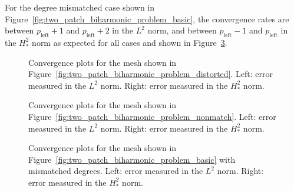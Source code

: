 For the degree mismatched case shown in Figure~\ref{fig:two_patch_biharmonic_problem_basic}, the convergence rates are between $p_\text{left}+1$ and $p_\text{left}+2$ in the $L^2$ norm, and between $p_\text{left}-1$ and $p_\text{left}$ in the $H^2_*$ norm as expected for all cases and shown in Figure~\ref{fig:two_patc_biharmonic_convergence_diff_degree}. \par

\begin{figure}[ht]
	\centering
	\begin{subfigure}[b]{0.47\textwidth}
		
	\end{subfigure}
	\hfill
	\begin{subfigure}[b]{0.47\textwidth}
		
	\end{subfigure}
	\caption{Convergence plots for the mesh shown in Figure~\ref{fig:two_patch_biharmonic_problem_distorted}. Left: error measured in the $L^2$ norm. Right: error measured in the $H^2_*$ norm.}\label{fig:two_patc_biharmonic_convergence_distorted}
\end{figure}

\begin{figure}[ht]
	\centering
	\begin{subfigure}[b]{0.47\textwidth}
		
	\end{subfigure}
	\hfill
	\begin{subfigure}[b]{0.47\textwidth}
		
	\end{subfigure}
	\caption{Convergence plots for the mesh shown in Figure~\ref{fig:two_patch_biharmonic_problem_nonmatch}. Left: error measured in the $L^2$ norm. Right: error measured in the $H^2_*$ norm.}\label{fig:two_patc_biharmonic_convergence_nonmatch}
\end{figure}

\begin{figure}[ht]
	\centering
	\begin{subfigure}[b]{0.47\textwidth}
		
	\end{subfigure}
	\hfill
	\begin{subfigure}[b]{0.47\textwidth}
		
	\end{subfigure}
	\caption{Convergence plots for the mesh shown in Figure~\ref{fig:two_patch_biharmonic_problem_basic} with mismatched degrees. Left: error measured in the $L^2$ norm. Right: error measured in the $H^2_*$ norm.}\label{fig:two_patc_biharmonic_convergence_diff_degree}
\end{figure}

